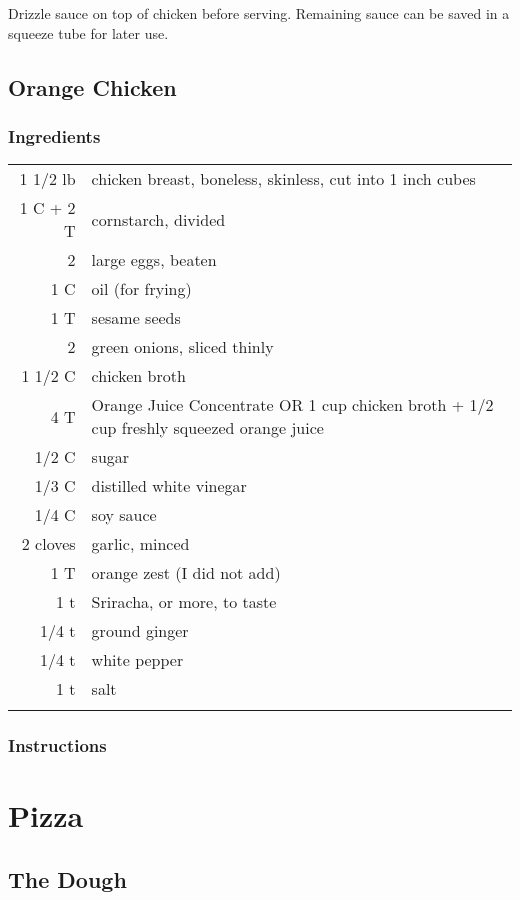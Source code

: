 \documentclass[12pt,landscape,twoside,twocolumn, openright, titlepage, draft]{book}
\begin{document}
Drizzle sauce on top of chicken before serving. Remaining sauce can
be saved in a squeeze tube for later use.

\section{Orange Chicken}

\subsection{Ingredients}

\begin{tabular}{r p{1.5in}}
  1 1/2 lb  & chicken breast, boneless, skinless, cut into 1 inch cubes \\
  1 C + 2 T & cornstarch, divided \\
  2         & large eggs, beaten \\
  1 C       & oil (for frying) \\
  1 T       & sesame seeds \\
  2         & green onions, sliced thinly \\
  1 1/2 C   & chicken broth \\
  4 T       & Orange Juice Concentrate OR 1 cup chicken broth + 1/2 cup freshly squeezed orange juice \\
  1/2 C     & sugar \\
  1/3 C     & distilled white vinegar \\
  1/4 C     & soy sauce \\
  2 cloves  & garlic, minced \\
  1 T       & orange zest (I did not add) \\
  1 t       & Sriracha, or more, to taste \\
  1/4 t     & ground ginger \\
  1/4 t     & white pepper \\
  1 t       & salt \\ \\
\end{tabular}

\subsection{Instructions}


\chapter{Pizza}
\section{The Dough}
\end{document}
